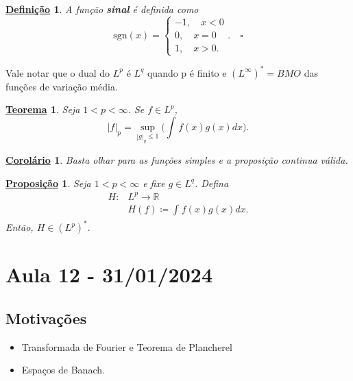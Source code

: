 \documentclass{article}
\newtheorem*{def*}{\underline{Defini\c c\~ao}}
\newtheorem*{theorem*}{\underline{Teorema}}
\newtheorem*{prop*}{\underline{Proposi\c c\~ao}}
\newtheorem*{crl*}{\underline{Corolário}}
\begin{document}
 \begin{def*}
   A função \textbf{sinal} é definida como 
   \[
   \mathrm{sgn}(x)  = \left\{\begin{array}{ll}
       -1,\quad x < 0\\ 
       0,\quad x = 0\\ 
       1,\quad x > 0.
     \end{array}\right..\quad \square
 \]
 \end{def*}
  Vale notar que o dual do \(L^{p}\) é \(L^{q}\) quando p é finito e \((L^{\infty})^{*} = BMO\) das funções de variação média.
 \begin{theorem*}
   Seja \(1< p < \infty\). Se \(f\in L^{p}\), 
     \[
       |f|_{p}=\sup_{|g|_{q}\leq 1}\biggl(\int_{}^{}f(x)g(x)dx\biggr).
     \]
 \end{theorem*}
 \begin{crl*}
   Basta olhar para as funções simples e a proposição continua válida.
 \end{crl*}
\begin{prop*}
  Seja \(1 < p < \infty\) e fixe \(g\in L^{q}\). Defina 
 \begin{align*}
   H:&L^{p}\rightarrow \mathbb{R}\\ 
     &H(f)\coloneqq \int_{}^{}f(x)g(x)dx.
 \end{align*}
 Então, \(H\in (L^{p})^{*}.\)
\end{prop*}
\newpage 

\section{Aula 12 - 31/01/2024}
\subsection{Motivações} 
 \begin{itemize}
   \item Transformada de Fourier e Teorema de Plancherel
   \item Espaços de Banach.
 \end{itemize}
\end{document}
